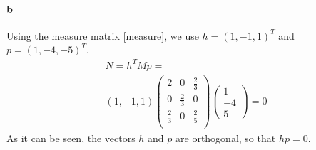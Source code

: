 \paragraph*{b}
Using the measure matrix \ref{measure}, we use $ h = ( 1 , -1 , 1 )^T $ and $ p = ( 1 , -4 , -5 )^T $.
\begin{gather*}
N = h^T M p = \\
\left( 1 , -1 , 1 \right)
 \left( \begin{array}{ccc}
2 & 0 & \frac{2}{3} \\
0 & \frac{2}{3} & 0 \\
\frac{2}{3} & 0 & \frac{2}{5}\\
\end{array} \right)
\left( \begin{array}{c}
1 \\ -4 \\ 5
\end{array}
\right) = 0
\end{gather*}
As it can be seen, the vectors $h$ and $p$ are orthogonal, so that $hp = 0$.

